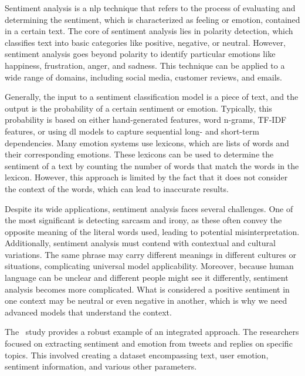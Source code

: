 Sentiment analysis is a \ac{nlp} technique that refers to the process of evaluating and determining the sentiment, which is characterized as feeling or emotion, contained in a certain text.
The core of sentiment analysis lies in polarity detection, which classifies text into basic categories like positive, negative, or neutral. However, sentiment analysis goes beyond polarity to identify particular emotions like happiness, frustration, anger, and sadness. This technique can be applied to a wide range of domains, including social media, customer reviews, and emails.

Generally, the input to a sentiment classification model is a piece of text, and the output is the probability of a certain sentiment or emotion. Typically, this probability is based on either hand-generated features, word n-grams, TF-IDF features, or using \ac{dl} models to capture sequential long- and short-term dependencies. Many emotion systems use lexicons, which are lists of words and their corresponding emotions. These lexicons can be used to determine the sentiment of a text by counting the number of words that match the words in the lexicon. However, this approach is limited by the fact that it does not consider the context of the words, which can lead to inaccurate results.

Despite its wide applications, sentiment analysis faces several challenges. One of the most significant is detecting sarcasm and irony, as these often convey the opposite meaning of the literal words used, leading to potential misinterpretation. Additionally, sentiment analysis must contend with contextual and cultural variations. The same phrase may carry different meanings in different cultures or situations, complicating universal model applicability. Moreover, because human language can be unclear and different people might see it differently, sentiment analysis becomes more complicated. What is considered a positive sentiment in one context may be neutral or even negative in another, which is why we need advanced models that understand the context.



The~\citet{SAILUNAZ2019101003} study provides a robust example of an integrated approach. The researchers focused on extracting sentiment and emotion from tweets and replies on specific topics. This involved creating a dataset encompassing text, user emotion, sentiment information, and various other parameters.

